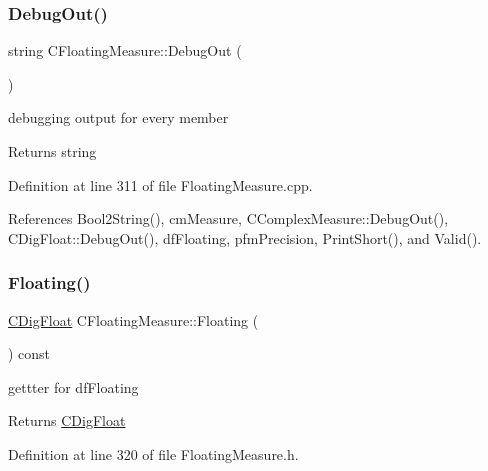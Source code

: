 \subsubsection{\texorpdfstring{Debug\+Out()}{DebugOut()}}
{\footnotesize\ttfamily string C\+Floating\+Measure\+::\+Debug\+Out (\begin{DoxyParamCaption}{ }\end{DoxyParamCaption})}



debugging output for every member 

\begin{DoxyReturn}{Returns}
string 
\end{DoxyReturn}


Definition at line 311 of file Floating\+Measure.\+cpp.



References Bool2\+String(), cm\+Measure, C\+Complex\+Measure\+::\+Debug\+Out(), C\+Dig\+Float\+::\+Debug\+Out(), df\+Floating, pfm\+Precision, Print\+Short(), and Valid().

\mbox{\label{classCFloatingMeasure_ab41354d28783d125159bd6e9372c6d9f}} 
\subsubsection{\texorpdfstring{Floating()}{Floating()}\hspace{0.1cm}{\footnotesize\ttfamily [1/2]}}
{\footnotesize\ttfamily \hyperlink{classCDigFloat}{C\+Dig\+Float} C\+Floating\+Measure\+::\+Floating (\begin{DoxyParamCaption}{ }\end{DoxyParamCaption}) const\hspace{0.3cm}{\ttfamily [inline]}}



gettter for df\+Floating 

\begin{DoxyReturn}{Returns}
\hyperlink{classCDigFloat}{C\+Dig\+Float} 
\end{DoxyReturn}


Definition at line 320 of file Floating\+Measure.\+h.

\mbox{\label{classCFloatingMeasure_aa33fe952e9c01f5f76cef5e6f0d03864}} 
